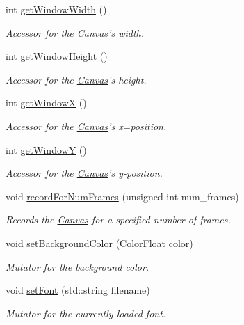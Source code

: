 \begin{DoxyCompactItemize}
int \hyperlink{class_canvas_a313206fc26b6f82770ca462f15d0d8c1}{get\+Window\+Width} ()
\begin{DoxyCompactList}\small\item\em Accessor for the \hyperlink{class_canvas}{Canvas}'s width. \end{DoxyCompactList}\item 
int \hyperlink{class_canvas_a59f0970506389b938c2bf1f7c53a3dc5}{get\+Window\+Height} ()
\begin{DoxyCompactList}\small\item\em Accessor for the \hyperlink{class_canvas}{Canvas}'s height. \end{DoxyCompactList}\item 
int \hyperlink{class_canvas_ab3a8868f7261a2a48647ab31000a949b}{get\+Window\+X} ()
\begin{DoxyCompactList}\small\item\em Accessor for the \hyperlink{class_canvas}{Canvas}'s x=position. \end{DoxyCompactList}\item 
int \hyperlink{class_canvas_ad24fcf3335ad5e0761d629aa59d01208}{get\+Window\+Y} ()
\begin{DoxyCompactList}\small\item\em Accessor for the \hyperlink{class_canvas}{Canvas}'s y-\/position. \end{DoxyCompactList}\item 
void \hyperlink{class_canvas_aa298d691c19203544f450cfe0b85cfa0}{record\+For\+Num\+Frames} (unsigned int num\+\_\+frames)
\begin{DoxyCompactList}\small\item\em Records the \hyperlink{class_canvas}{Canvas} for a specified number of frames. \end{DoxyCompactList}\item 
void \hyperlink{class_canvas_a9fa635156cf4e82aa27a7a4878823f1d}{set\+Background\+Color} (\hyperlink{struct_color_float}{Color\+Float} color)
\begin{DoxyCompactList}\small\item\em Mutator for the background color. \end{DoxyCompactList}\item 
void \hyperlink{class_canvas_a72698fe3b651fd6e630884a1ceaadc55}{set\+Font} (std\+::string filename)
\begin{DoxyCompactList}\small\item\em Mutator for the currently loaded font. \end{DoxyCompactList}\item 

\end{DoxyCompactItemize}

